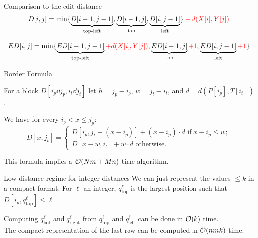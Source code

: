 \begin{frame}{Comparison to the edit distance}
  \[
  D[i,j] = {\min\{
  \underbrace{D[i-1,j-1]}_\text{top-left},
  \underbrace{D[i-1,j]}_\text{top},
  \underbrace{D[i,j-1]}_\text{left}
  \} \mathcolor{red}{+ d(X[i], Y[j])}
  }
      \]
  
  \[
  ED[i,j] = {\min\{
  \underbrace{ED[i-1,j-1]}_\text{top-left} \mathcolor{red}{+ d(X[i], Y[j])},
  \underbrace{ED[i-1,j]}_\text{top} \mathcolor{red}{+1},
  \underbrace{ED[i,j-1]}_\text{left} \mathcolor{red}{+1}
  \}
  }
      \]
  
  \pause
  

\end{frame}

\begin{frame}{Border Formula}
  \begin{center}
    
  \end{center}
  
  \small
  For a block $D[i_p \dd j_p, i_t \dd j_t]$ let $h=j_p-i_p$, $w =j_t-i_t$, and $d=d(P[i_p],T[i_t])$.
  
  
  We have for every $i_p < x \leq j_p$:
  \[
  D[x,j_t]= \begin{cases}
  D[i_p,j_t-(x-i_p)]+(x-i_p) \cdot d \text{ if } x-i_p \leq w; \\
  D[x-w,i_t]+w \cdot d \text{ otherwise}.
  \end{cases}
  \]
  
  This formula implies a $\mathcal{O}(Nm+ Mn)$-time algorithm.
  \end{frame}
  
  \begin{frame}{Low-distance regime for integer distances}
  We can just represent the values $\leq k$ in a compact format:
  For $\ell$ an integer, $q_{\mathrm{top}}^\ell$ is the largest position such that $D[i_p,q_{\mathrm{top}}^\ell] \leq \ell$.\pause
  \begin{center}
    
  \end{center}
  
  Computing $q_{\mathrm{bot}}^\ell$ and $q_{\mathrm{right}}^\ell$ from $q_{\mathrm{top}}^\ell$ and $q_{\mathrm{left}}^\ell$ can be done in $\mathcal{O}(k)$ time.\\\pause
  The compact representation of the last row can be computed in $\mathcal{O}(nmk)$ time.
  \end{frame}    
      